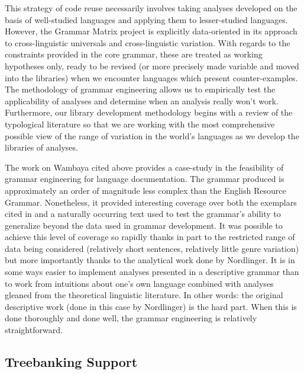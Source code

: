 \documentclass[12pt]{article}
\begin{document}
This strategy of code reuse necessarily involves taking analyses
developed on the basis of well-studied languages and applying them to
lesser-studied languages.  However, the Grammar Matrix project is
explicitly data-oriented in its approach to cross-linguistic
universals and cross-linguistic variation.  With regards to the
constraints provided in the core grammar, these are treated as working
hypotheses only, ready to be revised (or more precisely made variable
and moved into the libraries) when we encounter languages which
present counter-examples.  The methodology of grammar engineering
allows us to empirically test the applicability of analyses and
determine when an analysis really won't work.  Furthermore, our
library development methodology begins with a review of the
typological literature so that we are working with the most
comprehensive possible view of the range of variation in the world's
languages as we develop the libraries of analyses.

The work on Wambaya cited above \cite{Bender:08a} provides 
a case-study in the feasibility of grammar engineering for language
documentation.  The grammar produced is approximately an order
of magnitude less complex than the English Resource Grammar.
Nonetheless, it provided interesting coverage over both the
exemplars cited in  and a naturally occurring
text used to test the grammar's ability to generalize beyond the
data used in grammar development.  It was possible to achieve this
level of coverage so rapidly thanks in part to the restricted
range of data being considered (relatively short sentences, relatively
little genre variation) but more importantly thanks to the analytical
work done by Nordlinger.  It is in some ways easier to implement analyses
presented in a descriptive grammar than to work from intuitions about
one's own language combined with analyses gleaned from the theoretical
linguistic literature.  In other words: the original descriptive
work (done in this case by Nordlinger) is the hard part.  When this is
done thoroughly and done well, the grammar engineering is relatively
straightforward.

\subsection{Treebanking Support}
\end{document}
